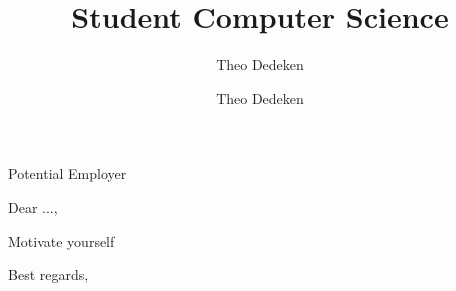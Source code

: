 \documentclass[11pt]{cover}
\author{Theo Dedeken}
\title{Student Computer Science}
\begin{document}
	
	
	\begin{letter}{
			Potential Employer
		} 
		
		
		\begin{covdetails}
		\end{covdetails} 
		
		\signature{Theo Dedeken} %
		
		
		\opening{Dear ...,} 
		
		Motivate yourself

		\closing{Best regards,}
		
	\end{letter}
	
\end{document}

